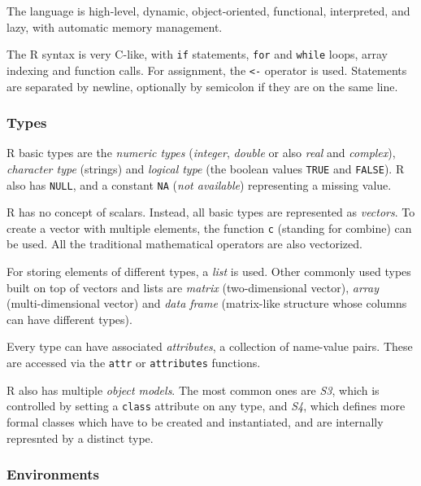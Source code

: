 The language is high-level, dynamic, object-oriented, functional, interpreted, and lazy, with automatic memory management.

The R syntax is very C-like, with \texttt{if} statements, \texttt{for} and \texttt{while} loops, array indexing and function calls. For assignment, the \texttt{<-} operator is used. Statements are separated by newline, optionally by semicolon if they are on the same line.

\subsubsection*{Types}

R basic types are the \textit{numeric types} (\textit{integer}, \textit{double} or also \textit{real} and \textit{complex}), \textit{character type} (strings) and \textit{logical type} (the boolean values \texttt{TRUE} and \texttt{FALSE}). R also has \texttt{NULL}, and a constant \texttt{NA} (\textit{not available}) representing a missing value.

R has no concept of scalars. Instead, all basic types are represented as \textit{vectors}. To create a vector with multiple elements, the function \texttt{c} (standing for combine) can be used. All the traditional mathematical operators are also vectorized.

For storing elements of different types, a \textit{list} is used. Other commonly used types built on top of vectors and lists are \textit{matrix} (two-dimensional vector), \textit{array} (multi-dimensional vector) and \textit{data frame} (matrix-like structure whose columns can have different types).

Every type can have associated \textit{attributes}, a collection of name-value pairs. These are accessed via the \texttt{attr} or \texttt{attributes} functions.

R also has multiple \textit{object models}. The most common ones are \textit{S3}, which is controlled by setting a \texttt{class} attribute on any type, and \textit{S4}, which defines more formal classes which have to be created and instantiated, and are internally represnted by a distinct type.

\subsubsection*{Environments}


